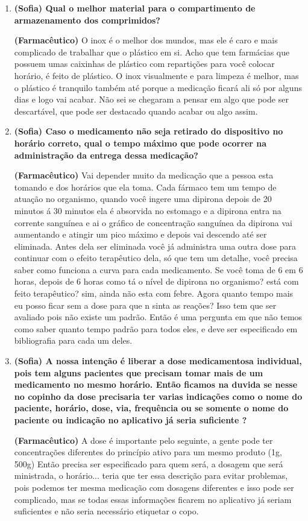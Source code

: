 \begin{apendicesenv}
\begin{enumerate}
\item \textbf{(Sofia) Qual o melhor material para o compartimento de armazenamento dos comprimidos?}

\textbf{(Farmacêutico)} O inox é o melhor dos mundos, mas ele é caro e mais complicado de trabalhar que o plástico em si. Acho que tem farmácias que possuem umas caixinhas de plástico com repartições para você colocar horário, é feito de plástico. O inox visualmente e para limpeza é melhor, mas o plástico é tranquilo também até porque a medicação ficará ali só por alguns dias e logo vai acabar. Não sei se chegaram a pensar em algo que pode ser descartável, que pode ser destacado quando acabar ou algo assim. 

\item \textbf{(Sofia) Caso o medicamento não seja retirado do dispositivo no horário correto, qual o tempo máximo que pode ocorrer na administração da entrega dessa medicação?}

\textbf{(Farmacêutico)} Vai depender muito da medicação que a pessoa esta tomando e dos horários que ela toma. Cada fármaco tem um tempo de atuação no organismo, quando você ingere uma dipirona depois de 20 minutos á 30 minutos ela é absorvida no estomago e a dipirona entra na corrente sanguínea e ai o gráfico de concentração sanguínea da dipirona vai aumentando e atingir um pico máximo e depois vai descendo até ser eliminada. Antes dela ser eliminada você já administra uma outra dose para continuar com o efeito terapêutico dela, só que tem um detalhe, você precisa saber como funciona a curva para cada medicamento. Se você toma de 6 em 6 horas, depois de 6 horas como tá o nível de dipirona no organismo? está com feito terapêutico? sim, ainda não esta com febre. Agora quanto tempo mais eu posso ficar sem a dose para que n sinta as reações? Isso tem que ser avaliado pois não existe um padrão. Então é uma pergunta em que não temos como saber quanto tempo padrão para todos eles, e deve ser especificado em bibliografia para cada um deles.

\item \textbf{(Sofia) A nossa intenção é liberar a dose medicamentosa individual, pois tem alguns pacientes que precisam tomar mais de um medicamento no mesmo horário. Então ficamos na duvida se nesse no copinho da dose precisaria ter varias indicações como o nome do paciente, horário, dose, via, frequência ou se somente o nome do paciente ou indicação no aplicativo já seria suficiente ?}

\textbf{(Farmacêutico)} A dose é importante pelo seguinte, a gente pode ter concentrações diferentes do princípio ativo para um mesmo  produto (1g, 500g) Então precisa ser especificado para quem será, a dosagem que será ministrada, o horário... teria que ter essa descrição para evitar problemas, pois podemos ter mesma medicação com dosagens diferentes e isso pode ser complicado, mas se todas essas informações ficarem no aplicativo já seriam suficientes e não seria necessário etiquetar o copo.


\end{enumerate}
\end{apendicesenv}
